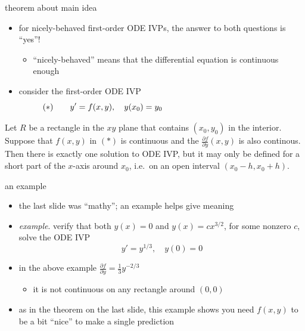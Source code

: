 \documentclass{beamer}
\begin{document}
\begin{frame}{theorem about main idea}

\begin{itemize}
\item for nicely-behaved first-order ODE IVPs, the answer to both questions is ``yes''!
    \begin{itemize}
    \item ``nicely-behaved'' means that the differential equation is continuous enough
    \end{itemize}
\item consider the first-order ODE IVP
    $$(\ast) \qquad y' = f(x,y), \quad y(x_0) = y_0 \hspace{50mm}$$
\end{itemize}

\begin{theorem}[1.2.1]
Let $R$ be a rectangle in the $xy$ plane that contains $(x_0,y_0)$ in the interior.  Suppose that $f(x,y)$ in $(\ast)$ is continuous and the $\frac{\partial f}{\partial y}(x,y)$ is also continous.  Then there is exactly one solution to ODE IVP, but it may only be defined for a short part of the $x$-axis around $x_0$, i.e.~on an open interval $(x_0-h,x_0+h)$.
\end{theorem}
\end{frame}


\begin{frame}{an example}

\begin{itemize}
\item the last slide was ``mathy''; an example helps give meaning
\item \emph{example}.  verify that both $y(x)=0$ and $y(x)=c x^{3/2}$, for some nonzero $c$, solve the ODE IVP
    $$y' = y^{1/3}, \quad y(0)=0$$

\vspace{30mm}
\item in the above example $\frac{\partial f}{\partial y} = \frac{1}{3} y^{-2/3}$
    \begin{itemize}
        \item it is not continuous on any rectangle around $(0,0)$
    \end{itemize}
\item as in the theorem on the last slide, this example shows you need $f(x,y)$ to be a bit ``nice'' to make a single prediction
\end{itemize}
\end{frame}
\end{document}
